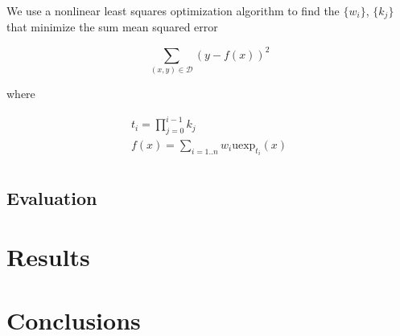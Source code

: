 \documentclass[12pt,a4paper]{article}
\newcommand{\uexp}[1] {{\text{uexp}_{#1}}}
\begin{document}
We use a nonlinear least squares optimization algorithm to find the $\{w_i\}$, $\{k_j\}$ that minimize the sum mean squared error 

\begin{equation}
\sum_{(x,y) \in \mathcal{D}} (y - f(x))^2
\end{equation}

\noindent where

\begin{equation}
\begin{array}{l}
t_i = \prod\limits_{j=0}^{i-1} k_j\\
f(x) = \sum\limits_{i=1..n} w_i \uexp{t_i}(x)\\
\end{array}
\end{equation}

\subsection{Evaluation}

\section{Results}

\section{Conclusions}

\dobibliography
\end{document}

